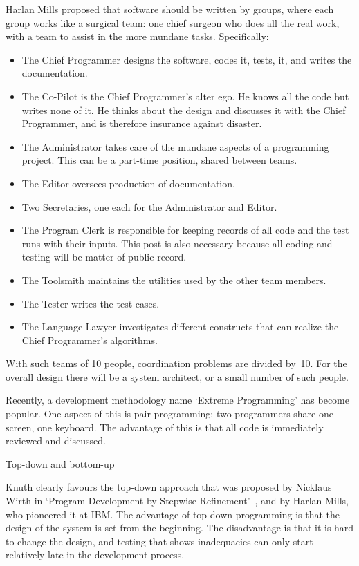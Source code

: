 Harlan Mills proposed that software should be written by groups, where
each group works like a surgical team: one chief
surgeon who does all the real work, with a team to assist in the more
mundane tasks. Specifically:
\begin{itemize}
\item The Chief Programmer designs the software, codes it, tests, it,
  and writes the documentation.
\item The Co-Pilot is the Chief Programmer's alter ego. He knows all
  the code but writes none of it. He thinks about the design and
  discusses it with the Chief Programmer, and is therefore insurance
  against disaster.
\item The Administrator takes care of the mundane aspects of a
  programming project. This can be a part-time position, shared
  between teams.
\item The Editor oversees production of documentation.
\item Two Secretaries, one each for the Administrator and Editor.
\item The Program Clerk is responsible for keeping records of all code
  and the test runs with their inputs. This post is also necessary
  because all coding and testing will be matter of public record.
\item The Toolsmith maintains the utilities used by the other team
  members.
\item The Tester writes the test cases.
\item The Language Lawyer investigates different constructs that can
  realize the Chief Programmer's algorithms.
\end{itemize}

With such teams of 10 people, coordination problems are divided
by~10. For the overall design there will be a system architect, or a
small number of such people.

Recently, a development methodology name `Extreme Programming' has become popular. One aspect of
this is pair programming: two programmers share one screen, one
keyboard. The advantage of this is that all code is immediately
reviewed and discussed.

 {Top-down and bottom-up}

Knuth clearly favours the top-down approach that was proposed by
Nicklaus Wirth in `Program Development by Stepwise
Refinement'~\cite{wirth:refinement}, and by Harlan Mills, who
pioneered it at IBM. The advantage of top-down programming is that the
design of the system is set from the beginning. The disadvantage is
that it is hard to change the design, and testing that shows
inadequacies can only start relatively late in the development
process.

